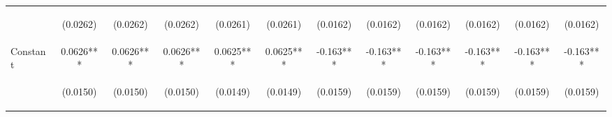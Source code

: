 \documentclass[]{article}
\begin{document}
\begin{center}
\begin{tabular}{lccccccccccc}
\vspace{4pt} & \begin{footnotesize}(0.0262)\end{footnotesize} & \begin{footnotesize}(0.0262)\end{footnotesize} & \begin{footnotesize}(0.0262)\end{footnotesize} & \begin{footnotesize}(0.0261)\end{footnotesize} & \begin{footnotesize}(0.0261)\end{footnotesize} & \begin{footnotesize}(0.0162)\end{footnotesize} & \begin{footnotesize}(0.0162)\end{footnotesize} & \begin{footnotesize}(0.0162)\end{footnotesize} & \begin{footnotesize}(0.0162)\end{footnotesize} & \begin{footnotesize}(0.0162)\end{footnotesize} & \begin{footnotesize}(0.0162)\end{footnotesize} \\
Constant & 0.0626*** & 0.0626*** & 0.0626*** & 0.0625*** & 0.0625*** & -0.163*** & -0.163*** & -0.163*** & -0.163*** & -0.163*** & -0.163*** \\
 & \begin{footnotesize}(0.0150)\end{footnotesize} & \begin{footnotesize}(0.0150)\end{footnotesize} & \begin{footnotesize}(0.0150)\end{footnotesize} & \begin{footnotesize}(0.0149)\end{footnotesize} & \begin{footnotesize}(0.0149)\end{footnotesize} & \begin{footnotesize}(0.0159)\end{footnotesize} & \begin{footnotesize}(0.0159)\end{footnotesize} & \begin{footnotesize}(0.0159)\end{footnotesize} & \begin{footnotesize}(0.0159)\end{footnotesize} & \begin{footnotesize}(0.0159)\end{footnotesize} & \begin{footnotesize}(0.0159)\end{footnotesize} \\

\end{tabular}
\end{center}
\end{document}
